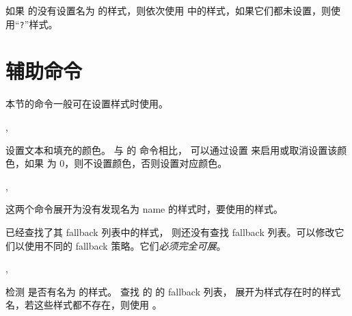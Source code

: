 \documentclass[class=article,openany]{cusdoc}
\begin{document}
\begin{function}{\THSetFallback}
  \begin{syntax}
    \V\THSetFallback {}  
  \end{syntax}
如果  的没有设置名为  的样式，则依次使用  中的样式，如果它们都未设置，则使用“\texttt{?}”样式。
\end{function}


\section{辅助命令}

本节的命令一般可在设置样式时使用。

\begin{function}{\THcolor,\THColorStatus}
  \begin{syntax}
    \V\THcolor {}
    \V\THcolor {} 
    \V\THColorStatus {}
  \end{syntax}
设置文本和填充的颜色。
与  的  命令相比， 可以通过设置  来启用或取消设置该颜色，如果  为 0，则不设置颜色，否则设置对应颜色。
\end{function}

\begin{function}[EXP]{\texhigh@fallback,\texhigh@fallback@}
  \begin{syntax}
    \V{\texhigh@fallback}   
    \V{\texhigh@fallback@}  
  \end{syntax}
这两个命令展开为没有发现名为 name 的样式时，要使用的样式。

 已经查找了其 fallback 列表中的样式， 则还没有查找 fallback 列表。可以修改它们以使用不同的 fallback 策略。它们\emph{必须完全可展}。
\end{function}

\begin{function}[EXP]{\texhigh@cat@if@exists,\texhigh@cat@fallback}
  \begin{syntax}
    \V{\texhigh@cat@if@exists}    
    \V{\texhigh@cat@fallback}   
  \end{syntax}
 检测  是否有名为  的样式。
 查找  的  的 fallback 列表，
展开为样式存在时的样式名，若这些样式都不存在，则使用 。
\end{function}
\end{document}

